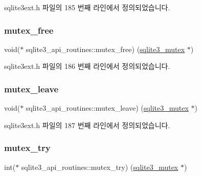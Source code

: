 sqlite3ext.\+h 파일의 185 번째 라인에서 정의되었습니다.

\mbox{\label{structsqlite3__api__routines_acbc66bc0d281c1b113c455409bdce8ad}} 
\subsubsection{\texorpdfstring{mutex\+\_\+free}{mutex\_free}}
{\footnotesize\ttfamily void($\ast$ sqlite3\+\_\+api\+\_\+routines\+::mutex\+\_\+free) (\hyperlink{sqlite3_8h_a0f546860bde03fddb33a9fed920da05c}{sqlite3\+\_\+mutex} $\ast$)}



sqlite3ext.\+h 파일의 186 번째 라인에서 정의되었습니다.

\mbox{\label{structsqlite3__api__routines_a7d02b385cc7de28a4a12cc2893d51f0a}} 
\subsubsection{\texorpdfstring{mutex\+\_\+leave}{mutex\_leave}}
{\footnotesize\ttfamily void($\ast$ sqlite3\+\_\+api\+\_\+routines\+::mutex\+\_\+leave) (\hyperlink{sqlite3_8h_a0f546860bde03fddb33a9fed920da05c}{sqlite3\+\_\+mutex} $\ast$)}



sqlite3ext.\+h 파일의 187 번째 라인에서 정의되었습니다.

\mbox{\label{structsqlite3__api__routines_aa3eed04dafa14724d23f3e74a6891575}} 
\subsubsection{\texorpdfstring{mutex\+\_\+try}{mutex\_try}}
{\footnotesize\ttfamily int($\ast$ sqlite3\+\_\+api\+\_\+routines\+::mutex\+\_\+try) (\hyperlink{sqlite3_8h_a0f546860bde03fddb33a9fed920da05c}{sqlite3\+\_\+mutex} $\ast$)}



